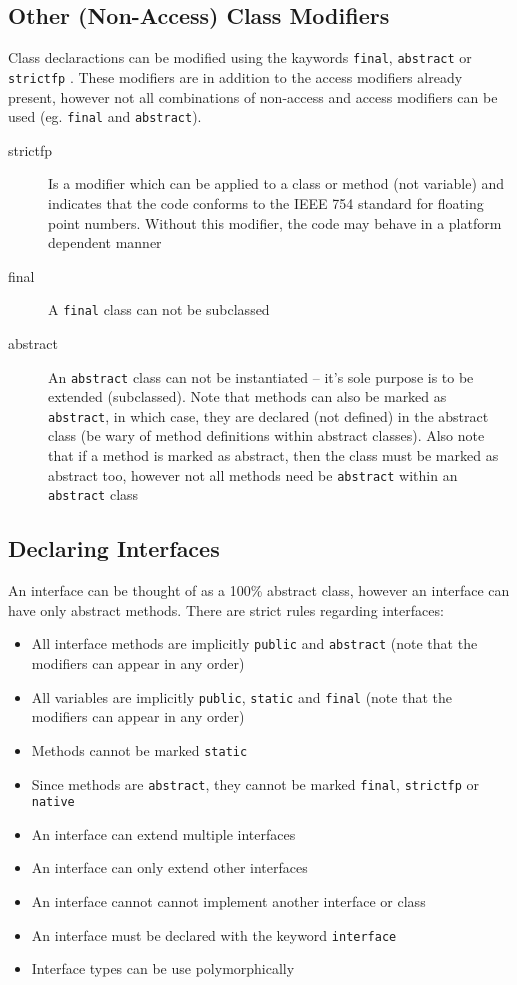 \subsection{Other (Non-Access) Class Modifiers}
Class declaractions can be modified using the kaywords \verb#final#, 
\verb#abstract# or \verb#strictfp# . These modifiers are in addition to the 
access modifiers already present, however not all combinations of non-access 
and access modifiers can be used (eg. \verb#final# and \verb#abstract#).
\begin{description}
    \item[strictfp] Is a modifier which can be applied to a class or method 
    (not variable) and indicates that the code conforms to the IEEE 754 
    standard for floating point numbers. Without this modifier, the code may 
    behave in a platform dependent manner
    \item[final] A \verb#final# class can not be subclassed
    \item[abstract] An \verb#abstract# class can not be instantiated -- it's 
    sole purpose is to be extended (subclassed). Note that methods can also be 
    marked as \verb#abstract#, in which case, they are declared (not defined) 
    in the abstract class (be wary of method definitions within abstract 
    classes). Also note that if a method is marked as abstract, then the class 
    must be marked as abstract too, however not all methods need be 
    \verb#abstract# within an \verb#abstract# class
\end{description}

\subsection{Declaring Interfaces}
An interface can be thought of as a 100\% abstract class, however an interface 
can have only abstract methods. There are strict rules regarding interfaces:
\begin{itemize}
    \item All interface methods are implicitly \verb#public# and 
    \verb#abstract# (note that the modifiers can appear in any order)
    \item All variables are implicitly \verb#public#, \verb#static# and 
    \verb#final# (note that the modifiers can appear in any order)
    \item Methods cannot be marked \verb#static#
    \item Since methods are \verb#abstract#, they cannot be marked 
    \verb#final#, \verb#strictfp# or \verb#native#
    \item An interface can extend multiple interfaces
    \item An interface can only extend other interfaces
    \item An interface cannot cannot implement another interface or class
    \item An interface must be declared with the keyword \verb#interface#
    \item Interface types can be use polymorphically
\end{itemize}

